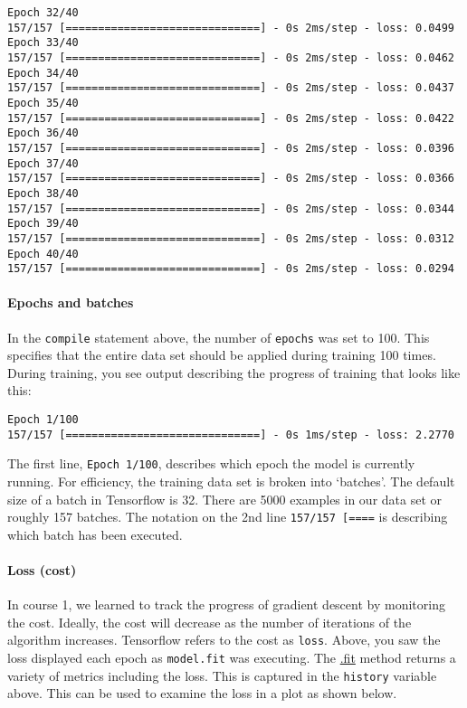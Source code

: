 \documentclass[11pt]{article}
\begin{document}
\begin{Verbatim}[commandchars=\\\{\}]
Epoch 32/40
157/157 [==============================] - 0s 2ms/step - loss: 0.0499
Epoch 33/40
157/157 [==============================] - 0s 2ms/step - loss: 0.0462
Epoch 34/40
157/157 [==============================] - 0s 2ms/step - loss: 0.0437
Epoch 35/40
157/157 [==============================] - 0s 2ms/step - loss: 0.0422
Epoch 36/40
157/157 [==============================] - 0s 2ms/step - loss: 0.0396
Epoch 37/40
157/157 [==============================] - 0s 2ms/step - loss: 0.0366
Epoch 38/40
157/157 [==============================] - 0s 2ms/step - loss: 0.0344
Epoch 39/40
157/157 [==============================] - 0s 2ms/step - loss: 0.0312
Epoch 40/40
157/157 [==============================] - 0s 2ms/step - loss: 0.0294
    \end{Verbatim}

    \hypertarget{epochs-and-batches}{%
\paragraph{Epochs and batches}\label{epochs-and-batches}}

In the \texttt{compile} statement above, the number of \texttt{epochs}
was set to 100. This specifies that the entire data set should be
applied during training 100 times. During training, you see output
describing the progress of training that looks like this:

\begin{verbatim}
Epoch 1/100
157/157 [==============================] - 0s 1ms/step - loss: 2.2770
\end{verbatim}

The first line, \texttt{Epoch\ 1/100}, describes which epoch the model
is currently running. For efficiency, the training data set is broken
into `batches'. The default size of a batch in Tensorflow is 32. There
are 5000 examples in our data set or roughly 157 batches. The notation
on the 2nd line \texttt{157/157\ {[}====} is describing which batch has
been executed.

    \hypertarget{loss-cost}{%
\paragraph{Loss (cost)}\label{loss-cost}}

In course 1, we learned to track the progress of gradient descent by
monitoring the cost. Ideally, the cost will decrease as the number of
iterations of the algorithm increases. Tensorflow refers to the cost as
\texttt{loss}. Above, you saw the loss displayed each epoch as
\texttt{model.fit} was executing. The
\href{https://www.tensorflow.org/api_docs/python/tf/keras/Model}{.fit}
method returns a variety of metrics including the loss. This is captured
in the \texttt{history} variable above. This can be used to examine the
loss in a plot as shown below.
\end{document}
